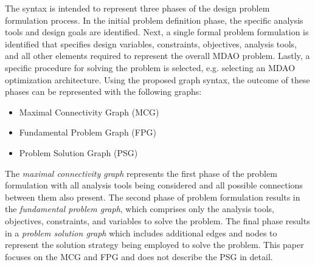   The syntax is intended to represent three phases of the design problem 
  formulation process. In the initial problem definition phase, the specific 
  analysis tools and design goals are identified. Next, a single formal problem 
  formulation is identified that specifies design variables, constraints, 
  objectives, analysis tools, and all other elements required to represent 
  the overall MDAO problem. Lastly, a specific procedure for solving the problem 
  is selected, e.g. selecting an MDAO optimization architecture. Using 
  the proposed graph syntax, the outcome of these phases can be represented with the following graphs:
  \begin{itemize}
    \item Maximal Connectivity Graph (MCG)
    \item Fundamental Problem Graph (FPG)
    \item Problem Solution Graph (PSG)
  \end{itemize}

  The \emph{maximal connectivity graph} represents the first phase of the problem 
  formulation with all analysis tools being considered and all possible connections 
  between them also present. The second phase of problem formulation results in the \emph{fundamental problem graph}, 
  which comprises only the analysis tools, objectives, constraints, and variables to solve the problem. 
  The final phase results in a \emph{problem solution graph} which includes additional 
  edges and nodes to represent the solution strategy being employed to solve the 
  problem. This paper focuses on the MCG and FPG and does not describe the PSG in detail.

